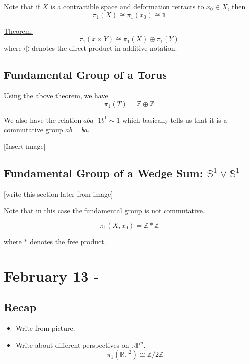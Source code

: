 \documentclass{article}
\begin{document}
\begin{dottedbox}
  Note that if $X$ is a contractible space and deformation retracts to $x_0 \in X$, then 
  \[ \pi_1(X) \cong \pi_1(x_0) \cong \mathbf{1} \]
\end{dottedbox}

\vskip 0.5cm
\begin{dottedbox}
  \underline{Theorem:} 
  \[ \pi_1(x \times Y) \cong \pi_1(X) \oplus \pi_1(Y) \]
  where $\oplus$ denotes the direct product in additive notation.
\end{dottedbox}

\vskip 1cm
\subsection{Fundamental Group of a Torus}

Using the above theorem, we have 
\[ \pi_1(T) = \mathbb{Z} \oplus \mathbb{Z} \]

We also have the relation $ab a^-1 b^1 \sim 1$ which basically tells us that it is a commutative group $ab = ba$.

[Insert image]

\subsection{Fundamental Group of a Wedge Sum: $\mathbb{S}^1 \vee \mathbb{S}^1$}

[write this section later from image]

Note that in this case the fundamental group is not commutative.

\[ \pi_1(X, x_0)  = \mathbb{Z} * \mathbb{Z} \]

where $*$ denotes the free product.

\pagebreak
\section{February 13 - }


\vskip 0.5cm
\subsection*{Recap}
\begin{itemize}
  \item Write from picture.
  \item Write about different perspectives on $\mathbb{RP}^n$.
  \[ \pi_1 \left( \mathbb{RP}^2 \right) \cong \mathbb{Z}/2\mathbb{Z} \]
\end{itemize}
\end{document}
